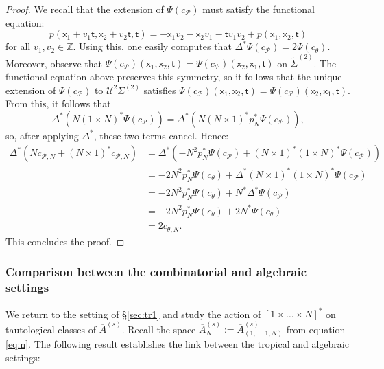\documentclass[11pt]{article}
\newcommand{\barA}{\overline{A}}
\theoremstyle{definition}
\begin{document}
\begin{proof}
	We recall that the extension of $\Psi(c_{\mathcal P})$ must satisfy the functional equation:
	$$p(\mathsf{x}_1+v_1\mathsf{t},\mathsf{x}_2+v_2\mathsf{t},\mathsf{t})=-\mathsf{x}_1v_2-\mathsf{x}_2v_1-\mathsf{t}v_1v_2+p(\mathsf{x}_1,\mathsf{x}_2,\mathsf{t})$$
	for all $v_1,v_2\in \mathbb{Z}$. Using this, one easily computes that $\Delta^{\ast}\Psi(c_{\mathcal P})=2\Psi(c_{\theta})$. Moreover, observe
	that $\Psi(c_{\mathcal P})(\mathsf{x}_1,\mathsf{x}_2,\mathsf{t})=\Psi(c_{\mathcal P})(\mathsf{x}_2,\mathsf{x}_1,\mathsf{t})$ on $\tilde{\Sigma}^{(2)}$. The functional equation above preserves this symmetry, so it
	follows that the unique extension of $\Psi(c_{\mathcal P})$ to $\mathcal U^2\Sigma^{(2)}$ satisfies $\Psi(c_{\mathcal P})(\mathsf{x}_1,\mathsf{x}_2,\mathsf{t})=\Psi(c_{\mathcal P})(\mathsf{x}_2,\mathsf{x}_1,\mathsf{t})$. From this, it follows that
	$$\Delta^{\ast}(N(1\times N)^{\ast}\Psi(c_{\mathcal P}))=\Delta^{\ast}(N(N\times 1)^{\ast}p_N^{\ast}\Psi(c_{\mathcal P})),$$
	so, after applying $\Delta^{\ast}$, these two terms cancel. Hence:
	\begin{align*}
		\Delta^{\ast}(Nc_{\mathcal P,N}+(N\times 1)^{\ast}c_{\mathcal P,N})&=\Delta^{\ast}(-N^{2}p_N^{\ast}\Psi(c_{\mathcal P})+(N\times 1)^{\ast}(1\times N)^{\ast}\Psi(c_{\mathcal P}))\\
														   &=-2N^{2}p_N^{\ast}\Psi(c_{\theta})+\Delta^{\ast}(N\times 1)^{\ast}(1\times N)^{\ast}\Psi(c_{\mathcal P})\\
														   &=-2N^{2}p_N^{\ast}\Psi(c_{\theta})+N^{\ast}\Delta^{\ast}\Psi(c_{\mathcal P})\\
														   &=-2N^{2}p_N^{\ast}\Psi(c_{\theta})+2N^{\ast}\Psi(c_{\theta})\\
														   &=2c_{\theta,N}.
	\end{align*}
	This concludes the proof.
\end{proof}

\subsubsection{Comparison between the combinatorial and algebraic settings}

We return to the setting of \S\ref{sec:tr1} and study the action of $[1\times\dots\times N]^{\ast}$
on tautological classes of $\barA^{(s)}$.
Recall the space
$\barA_N^{(s)}:=\barA_{(1,\dots,1,N)}^{(s)}$ from equation \ref{eq:n}.
The following result
establishes the link between the tropical and algebraic settings:
\end{document}

